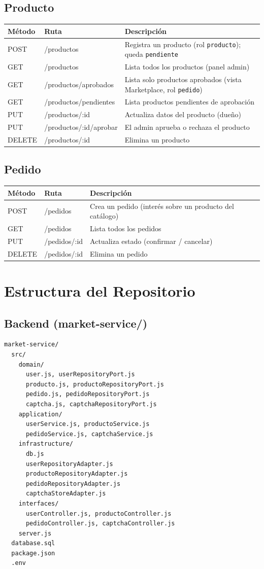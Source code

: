 \documentclass[11pt,a4paper]{article}
\begin{document}
\subsection{Producto}
\begin{longtable}{p{1.5cm}p{4cm}p{7cm}}
\toprule
\textbf{Método} & \textbf{Ruta} & \textbf{Descripción} \\
\midrule
\endhead
POST & /productos & Registra un producto (rol \texttt{producto}); queda \texttt{pendiente} \\
GET & /productos & Lista todos los productos (panel admin) \\
GET & /productos/aprobados & Lista solo productos aprobados (vista Marketplace, rol \texttt{pedido}) \\
GET & /productos/pendientes & Lista productos pendientes de aprobación \\
PUT & /productos/:id & Actualiza datos del producto (dueño) \\
PUT & /productos/:id/aprobar & El admin aprueba o rechaza el producto \\
DELETE & /productos/:id & Elimina un producto \\
\bottomrule
\end{longtable}
 
\subsection{Pedido}
\begin{longtable}{p{1.5cm}p{4cm}p{7cm}}
\toprule
\textbf{Método} & \textbf{Ruta} & \textbf{Descripción} \\
\midrule
\endhead
POST & /pedidos & Crea un pedido (interés sobre un producto del catálogo) \\
GET & /pedidos & Lista todos los pedidos \\
PUT & /pedidos/:id & Actualiza estado (confirmar / cancelar) \\
DELETE & /pedidos/:id & Elimina un pedido \\
\bottomrule
\end{longtable}
 
\section{Estructura del Repositorio}
 
\subsection{Backend (market-service/)}
\begin{lstlisting}
market-service/
  src/
    domain/
      user.js, userRepositoryPort.js
      producto.js, productoRepositoryPort.js
      pedido.js, pedidoRepositoryPort.js
      captcha.js, captchaRepositoryPort.js
    application/
      userService.js, productoService.js
      pedidoService.js, captchaService.js
    infrastructure/
      db.js
      userRepositoryAdapter.js
      productoRepositoryAdapter.js
      pedidoRepositoryAdapter.js
      captchaStoreAdapter.js
    interfaces/
      userController.js, productoController.js
      pedidoController.js, captchaController.js
    server.js
  database.sql
  package.json
  .env
\end{lstlisting}
 
\end{document}
